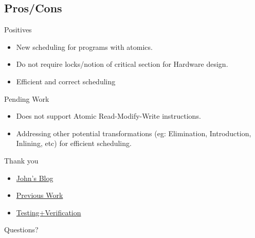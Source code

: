 \documentclass[notes xcolor=dvipsnames]{beamer}
\begin{document}
    \subsection{Pros/Cons}

    \begin{frame}{Positives}

        \begin{itemize}
            \item New scheduling for programs with atomics.
            \item Do not require locks/notion of critical section for Hardware design.
            \item Efficient and correct scheduling  
        \end{itemize}

    \end{frame}

    \begin{frame}{Pending Work}

        \begin{itemize}
            \item Does not support Atomic Read-Modify-Write instructions. 
            \item Addressing other potential transformations (eg: Elimination, Introduction, Inlining, etc) for efficient scheduling. 
        \end{itemize}

    \end{frame}


    \begin{frame}{Thank you}

        \begin{itemize}
            \item \href{https://johnwickerson.wordpress.com/2017/02/23/translating-lock-free-relaxed-concurrency-from-software-into-hardware/}{John's Blog}
            \item \href{https://dl.acm.org/doi/10.1145/3020078.3021733}{Previous Work}
            \item \href{https://github.com/nadeshr/weak_atomics}{Testing+Verification}
        \end{itemize}

        Questions?

    \end{frame}
\end{document}
